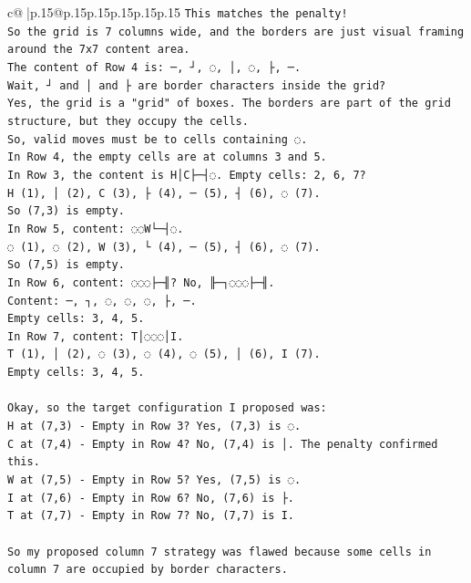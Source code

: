 \documentclass{article}
\begin{document}
{\begin{supertabular}{c@{$\;$}|p{.15\linewidth}@{}p{.15\linewidth}p{.15\linewidth}p{.15\linewidth}p{.15\linewidth}p{.15\linewidth}}
{{{\texttt{This matches the penalty!} \\
\texttt{So the grid is 7 columns wide, and the borders are just visual framing around the 7x7 content area.} \\
\texttt{The content of Row 4 is: ─, ┘, ◌, │, ◌, ├, ─.} \\
\texttt{Wait, ┘ and │ and ├ are border characters inside the grid?} \\
\texttt{Yes, the grid is a "grid" of boxes. The borders are part of the grid structure, but they occupy the cells.} \\
\texttt{So, valid moves must be to cells containing ◌.} \\
\texttt{In Row 4, the empty cells are at columns 3 and 5.} \\
\texttt{In Row 3, the content is H│C├─┤◌. Empty cells: 2, 6, 7?} \\
\texttt{H (1), │ (2), C (3), ├ (4), ─ (5), ┤ (6), ◌ (7).} \\
\texttt{So (7,3) is empty.} \\
\texttt{In Row 5, content: ◌◌W└─┤◌.} \\
\texttt{◌ (1), ◌ (2), W (3), └ (4), ─ (5), ┤ (6), ◌ (7).} \\
\texttt{So (7,5) is empty.} \\
\texttt{In Row 6, content: ◌◌◌├─╢? No, ╟─┐◌◌◌├─╢.} \\
\texttt{Content: ─, ┐, ◌, ◌, ◌, ├, ─.} \\
\texttt{Empty cells: 3, 4, 5.} \\
\texttt{In Row 7, content: T│◌◌◌│I.} \\
\texttt{T (1), │ (2), ◌ (3), ◌ (4), ◌ (5), │ (6), I (7).} \\
\texttt{Empty cells: 3, 4, 5.} \\
\\ 
\texttt{Okay, so the target configuration I proposed was:} \\
\texttt{H at (7,3) {-} Empty in Row 3? Yes, (7,3) is ◌.} \\
\texttt{C at (7,4) {-} Empty in Row 4? No, (7,4) is │. The penalty confirmed this.} \\
\texttt{W at (7,5) {-} Empty in Row 5? Yes, (7,5) is ◌.} \\
\texttt{I at (7,6) {-} Empty in Row 6? No, (7,6) is ├.} \\
\texttt{T at (7,7) {-} Empty in Row 7? No, (7,7) is I.} \\
\\ 
\texttt{So my proposed column 7 strategy was flawed because some cells in column 7 are occupied by border characters.} \\
}}}
\end{supertabular}}
\end{document}
